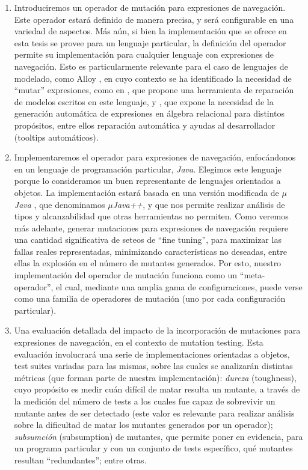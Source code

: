 \begin{enumerate}
	\item Introduciremos un operador de mutaci\'on para expresiones de navegaci\'on. Este operador estar\'a definido de manera precisa, y ser\'a configurable en una variedad de aspectos. M\'as a\'un, si bien la implementaci\'on que se ofrece en esta tesis se provee para un lenguaje particular, la definici\'on del operador permite su implementaci\'on para cualquier lenguaje con expresiones de navegaci\'on. Esto es particularmente relevante para el caso de lenguajes de modelado, como Alloy \cite{bibliography.books.SoftwareAbstractions-alloy}, en cuyo contexto se ha identificado la necesidad de ``mutar'' expresiones, como en \cite{bibliography.repair.mutation.AlloyWang18}, que propone una herramienta de reparaci\'on de modelos escritos en este lenguaje, y \cite{bibliography.algebraicExpressions.RexGenWang18}, que expone la necesidad de la generaci\'on autom\'atica de expresiones en \'algebra relacional para distintos prop\'ositos, entre ellos reparaci\'on autom\'atica y ayudas al desarrollador (tooltips autom\'aticos).
	
	\item Implementaremos el operador para expresiones de navegaci\'on, enfoc\'andonos en un lenguaje de programaci\'on particular, \emph{Java}. Elegimos este lenguaje porque lo consideramos un buen representante de lenguajes orientados a objetos. La implementaci\'on estar\'a basada en una versi\'on modificada de \emph{$\mu$Java} \cite{bibliography.mutation.tools.muJavaMaOK05}, que denominamos \emph{$\mu$Java++}, y que nos permite realizar an\'alisis de tipos y alcanzabilidad que otras herramientas no permiten. Como veremos m\'as adelante, generar mutaciones para expresiones de navegaci\'on requiere una cantidad significativa de seteos de ``fine tuning'', para maximizar las fallas reales representadas, minimizando caracter\'isticas no deseadas, entre ellas la explosi\'on en el n\'umero de mutantes generados. Por esto, nuestro implementaci\'on del operador de mutaci\'on funciona como un ``meta-operador'', el cual, mediante una amplia gama de configuraciones, puede verse como una familia de operadores de mutaci\'on (uno por cada configuraci\'on particular). 

    \item Una evaluaci\'on detallada del impacto de la incorporaci\'on de mutaciones para expresiones de navegaci\'on, en el contexto de mutation testing. Esta evaluaci\'on involucrar\'a una serie de implementaciones orientadas a objetos, test suites variadas para las mismas, sobre las cuales se analizar\'an distintas m\'etricas (que forman parte de nuestra implementaci\'on): \emph{dureza} (toughness), cuyo prop\'osito es medir cu\'an dif\'icil de matar resulta un mutante, a trav\'es de la medici\'on del n\'umero de tests a los cuales fue capaz de sobrevivir un mutante antes de ser detectado (este valor es relevante para realizar an\'alisis sobre la dificultad de matar los mutantes generados por un operador); \emph{subsumci\'on} (subsumption) de mutantes, que permite poner en evidencia, para un programa particular y con un conjunto de tests espec\'ifico, qu\'e mutantes resultan ``redundantes''; entre otras. 


\end{enumerate}
